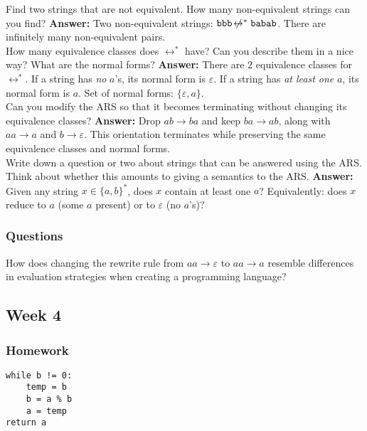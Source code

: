 \documentclass{article}
\theoremstyle{theorem}
\theoremstyle{definition}
\theoremstyle{remark}
\begin{document}
Find two strings that are not equivalent. How many non-equivalent strings can you find?  
\textbf{Answer:} Two non-equivalent strings: \(\texttt{bbb} \not\!\leftrightarrow^{*} \texttt{babab}\). There are infinitely many non-equivalent pairs.\\[1em]

How many equivalence classes does \(\leftrightarrow^{*}\) have? Can you describe them in a nice way? What are the normal forms?  
\textbf{Answer:} There are \(2\) equivalence classes for \(\leftrightarrow^{*}\).  
If a string has \emph{no} \(a\)’s, its normal form is \(\varepsilon\).  
If a string has \emph{at least one} \(a\), its normal form is \(a\).  
Set of normal forms: \(\{\varepsilon, a\}\).\\[1em]

Can you modify the ARS so that it becomes terminating without changing its equivalence classes?  
\textbf{Answer:} Drop \(ab \to ba\) and keep \(ba \to ab\), along with \(aa \to a\) and \(b \to \varepsilon\).  
This orientation terminates while preserving the same equivalence classes and normal forms.\\[1em]

Write down a question or two about strings that can be answered using the ARS. Think about whether this amounts to giving a semantics to the ARS.  
\textbf{Answer:} Given any string \(x \in \{a,b\}^{*}\), does \(x\) contain at least one \(a\)?  
Equivalently: does \(x\) reduce to \(a\) (some \(a\) present) or to \(\varepsilon\) (no \(a\)’s)?\\[1em]

\subsubsection{Questions}

How does changing the rewrite rule from $aa \to \varepsilon$ to $aa \to a$ resemble differences in evaluation strategies when creating a programming language?

\subsection{Week 4}

\subsubsection{Homework}

\begin{verbatim}
while b != 0:
    temp = b
    b = a % b
    a = temp
return a
\end{verbatim}
\end{document}

